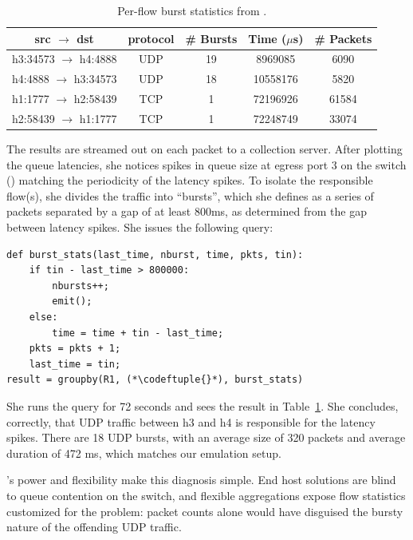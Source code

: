 \begin{table}[t]
\centering
\small
\begin{tabular}{|c|c|c|c|c|} \hline
\bf{src $\rightarrow$ dst} & \bf{protocol} & \bf{\# Bursts} & \bf{Time ($\mu$s)} & \bf{\# Packets} \\ \hline
h3:34573 $\rightarrow$ h4:4888 & UDP & 19 & 8969085 & 6090 \\
h4:4888 $\rightarrow$ h3:34573 & UDP & 18 & 10558176 & 5820 \\
h1:1777 $\rightarrow$ h2:58439 & TCP & 1 & 72196926 & 61584 \\
h2:58439 $\rightarrow$ h1:1777 & TCP & 1 & 72248749 & 33074 \\ \hline
\end{tabular}
\caption{Per-flow burst statistics from \TheSystem.}
\label{t:mininet-flowstats}
\vspace{-0.1in}
\end{table}

The results are streamed out on each packet to a collection server. After
plotting the queue latencies, she notices spikes in queue size at egress port 3
on the switch () matching the periodicity of the latency
spikes. To isolate the responsible flow(s), she divides the traffic into
``bursts'', which she defines as a series of packets separated by a gap of at
least 800ms, as determined from the gap between latency spikes. She issues the
following \TheSystem query:

\begin{small}
\begin{lstlisting}
def burst_stats(last_time, nburst, time, pkts, tin):
    if tin - last_time > 800000:
        nbursts++;
        emit();
    else:
        time = time + tin - last_time;
    pkts = pkts + 1;
    last_time = tin;
result = groupby(R1, (*\codeftuple{}*), burst_stats)
\end{lstlisting}
\end{small}


She runs the query for 72 seconds and sees the result in
Table~\ref{t:mininet-flowstats}. She concludes, correctly, that UDP traffic
between {\ct h3} and {\ct h4} is responsible for the latency spikes.
There are 18 UDP bursts, with an average size of 320 packets and
average duration of 472 ms, which matches our emulation setup.

\TheSystem's power and flexibility make this diagnosis simple. End host solutions
 are blind to queue contention on the switch, and flexible
aggregations expose flow statistics customized for the problem:
packet counts alone would have disguised the bursty nature of
the offending UDP traffic.


